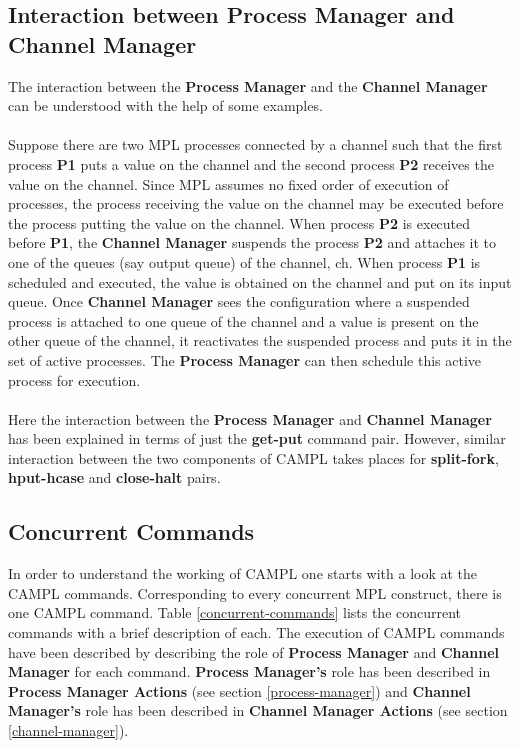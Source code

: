 \documentclass[11pt]{article}
\newcommand{\<}{\langle}
\renewcommand{\>}{\rangle}
\begin{document}
\subsection {Interaction between Process Manager and Channel Manager}
The interaction between the {\bf Process Manager} and the {\bf Channel Manager} can be understood with the help of some examples.
~~\\~~\\
Suppose there are two MPL processes connected by a channel such that the first process {\bf P1} puts a value on the channel and the second process {\bf P2} receives the value on the channel. Since MPL assumes no fixed order of execution of processes, the process receiving the value on the channel may be executed before the process putting the value on the channel. When process {\bf P2} is executed before {\bf P1}, the {\bf Channel Manager} suspends the process {\bf P2} and attaches it to one of the queues (say output queue) of the channel, ch. When process {\bf P1} is scheduled and executed, the value is obtained on the channel and put on its input queue. Once {\bf Channel Manager} sees the configuration where a suspended process is attached to one queue of the channel and a value is present on the other queue of the channel, it reactivates the suspended process and puts it in the set of active processes. The {\bf Process Manager} can then schedule this active process for execution.
~~\\~~\\ 
Here the interaction between the {\bf Process Manager} and {\bf Channel Manager} has been explained in terms of just the {\bf get-put} command pair. However, similar interaction between the two components of CAMPL takes places for {\bf split-fork}, {\bf hput-hcase} and {\bf close-halt} pairs.
\subsection {Concurrent Commands}
In order to understand the working of CAMPL one starts with a look at the CAMPL commands. Corresponding to every concurrent MPL construct, there is one CAMPL command. Table \ref {concurrent-commands} lists the concurrent commands with a brief description of each. The execution of CAMPL commands have been described by describing the role of {\bf Process Manager} and {\bf Channel Manager} for each command. {\bf Process Manager's} role has been described in  {\bf Process Manager Actions} (see section \ref {process-manager}) and {\bf Channel Manager's} role has been described in {\bf Channel Manager Actions} (see section  \ref {channel-manager}).   
\end{document}
